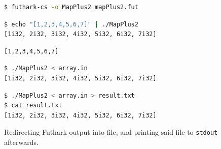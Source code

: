 \begin{figure}[H]
  \centering
\begin{subfigure}
  
  \begin{lstlisting}[language=sh]
$ futhark-cs -o MapPlus2 mapPlus2.fut
  \end{lstlisting}
  \caption{We call the Futhark-to-\csharp{} compiler \texttt{futhark-cs} on
    mapPlus2.fut}
  \label{fig:shortfutharkprogram4''}
\end{subfigure}

\vspace{1em} 

\begin{subfigure}
  
  \begin{lstlisting}[language=sh]
$ echo "[1,2,3,4,5,6,7]" | ./MapPlus2
[1i32, 2i32, 3i32, 4i32, 5i32, 6i32, 7i32]
  \end{lstlisting}
  \caption{Piping arguments wrapped in a string into our Futhark executable}
  \label{fig:shortfutharkprogram5''}
\end{subfigure}

\vspace{1em} 

\begin{subfigure}
  
  \begin{lstlisting}
[1,2,3,4,5,6,7]
  \end{lstlisting}
  \caption{The contents of \texttt{array.in}}
  \label{fig:array.in}
\end{subfigure}

\vspace{1em} 

\begin{subfigure}
  
  \begin{lstlisting}[language=sh]
$ ./MapPlus2 < array.in
[1i32, 2i32, 3i32, 4i32, 5i32, 6i32, 7i32]
  \end{lstlisting}
  \caption{Redirecting arguments stored in a dataset file into our Futhark executable}
  \label{fig:shortfutharkprogram5'''}
\end{subfigure}

\vspace{1em} 

\begin{subfigure}
  
  \begin{lstlisting}[language=sh]
$ ./MapPlus2 < array.in > result.txt
$ cat result.txt
[1i32, 2i32, 3i32, 4i32, 5i32, 6i32, 7i32]
  \end{lstlisting}
  \caption{Redirecting Futhark output into file, and printing said file to
    \texttt{stdout} afterwards.}
  \label{fig:shortfutharkprogram6'}
\end{subfigure}
\end{figure}

